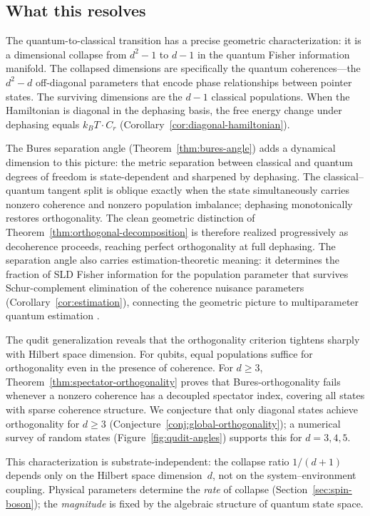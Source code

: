 \documentclass[12pt,a4paper]{article}
\theoremstyle{definition}
\theoremstyle{remark}
\begin{document}
\subsection{What this resolves}
\label{sec:resolves}

The quantum-to-classical transition has a precise geometric characterization: it is a dimensional collapse from $d^2 - 1$ to $d - 1$ in the quantum Fisher information manifold. The collapsed dimensions are specifically the quantum coherences---the $d^2 - d$ off-diagonal parameters that encode phase relationships between pointer states. The surviving dimensions are the $d - 1$ classical populations. When the Hamiltonian is diagonal in the dephasing basis, the free energy change under dephasing equals $k_B T \cdot C_r$ (Corollary~\ref{cor:diagonal-hamiltonian}).

The Bures separation angle (Theorem~\ref{thm:bures-angle}) adds a dynamical dimension to this picture: the metric separation between classical and quantum degrees of freedom is state-dependent and sharpened by dephasing.  The classical--quantum tangent split is oblique exactly when the state simultaneously carries nonzero coherence and nonzero population imbalance; dephasing monotonically restores orthogonality.  The clean geometric distinction of Theorem~\ref{thm:orthogonal-decomposition} is therefore realized progressively as decoherence proceeds, reaching perfect orthogonality at full dephasing.  The separation angle also carries estimation-theoretic meaning: it determines the fraction of SLD Fisher information for the population parameter that survives Schur-complement elimination of the coherence nuisance parameters (Corollary~\ref{cor:estimation}), connecting the geometric picture to multiparameter quantum estimation \cite{zhang2025hybrid,albarelli2019restoring,wang2024multiparameter}.

The qudit generalization reveals that the orthogonality criterion tightens sharply with Hilbert space dimension.  For qubits, equal populations suffice for orthogonality even in the presence of coherence.  For $d \geq 3$, Theorem~\ref{thm:spectator-orthogonality} proves that Bures-orthogonality fails whenever a nonzero coherence has a decoupled spectator index, covering all states with sparse coherence structure.  We conjecture that only diagonal states achieve orthogonality for $d \geq 3$ (Conjecture~\ref{conj:global-orthogonality}); a numerical survey of random states (Figure~\ref{fig:qudit-angles}) supports this for $d = 3, 4, 5$.

This characterization is substrate-independent: the collapse ratio $1/(d+1)$ depends only on the Hilbert space dimension~$d$, not on the system--environment coupling.  Physical parameters determine the \emph{rate} of collapse (Section~\ref{sec:spin-boson}); the \emph{magnitude} is fixed by the algebraic structure of quantum state space.
\end{document}
